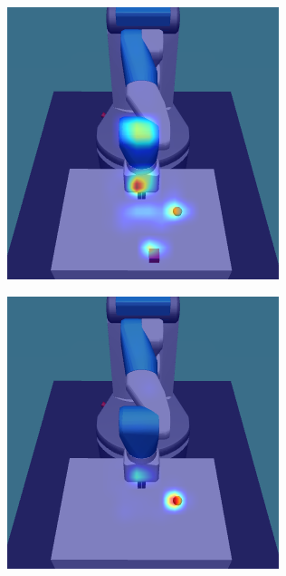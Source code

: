 \begin{figure}
\begin{subfigure}{0.24\columnwidth}
  \end{subfigure}
  \begin{subfigure}{0.24\columnwidth}
    \includegraphics[width=\linewidth]{figures/chapter6/distractor_saliency_fetch_pro_off/shape_visual_std}
  \end{subfigure}
  \begin{subfigure}{0.24\columnwidth}
    \includegraphics[width=\linewidth]{figures/chapter6/distractor_saliency_fetch_pro_on/standard_sensor_std}
  \end{subfigure}
  

\end{figure}
